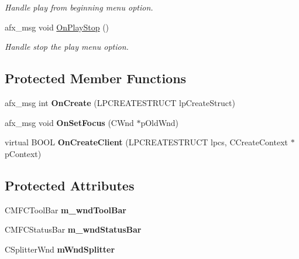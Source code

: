 \begin{DoxyCompactItemize}
\begin{DoxyCompactList}\small\item\em Handle play from beginning menu option. \end{DoxyCompactList}\item 
\hypertarget{class_c_main_frame_a75fade7a5583c8019e2f98d9196509bf}{afx\+\_\+msg void \hyperlink{class_c_main_frame_a75fade7a5583c8019e2f98d9196509bf}{On\+Play\+Stop} ()}\label{class_c_main_frame_a75fade7a5583c8019e2f98d9196509bf}

\begin{DoxyCompactList}\small\item\em Handle stop the play menu option. \end{DoxyCompactList}\end{DoxyCompactItemize}
\subsection*{Protected Member Functions}
\begin{DoxyCompactItemize}
\item 
\hypertarget{class_c_main_frame_a48666466fd37412fcaeff75c3b12e0ed}{afx\+\_\+msg int {\bfseries On\+Create} (L\+P\+C\+R\+E\+A\+T\+E\+S\+T\+R\+U\+C\+T lp\+Create\+Struct)}\label{class_c_main_frame_a48666466fd37412fcaeff75c3b12e0ed}

\item 
\hypertarget{class_c_main_frame_adc353a3d1fc497fbc009b6d9e6914a82}{afx\+\_\+msg void {\bfseries On\+Set\+Focus} (C\+Wnd $\ast$p\+Old\+Wnd)}\label{class_c_main_frame_adc353a3d1fc497fbc009b6d9e6914a82}

\item 
\hypertarget{class_c_main_frame_ac863d694fd3637d492ef97396defbd8e}{virtual B\+O\+O\+L {\bfseries On\+Create\+Client} (L\+P\+C\+R\+E\+A\+T\+E\+S\+T\+R\+U\+C\+T lpcs, C\+Create\+Context $\ast$p\+Context)}\label{class_c_main_frame_ac863d694fd3637d492ef97396defbd8e}

\end{DoxyCompactItemize}
\subsection*{Protected Attributes}
\begin{DoxyCompactItemize}
\item 
\hypertarget{class_c_main_frame_ac8558942627d1502b5095e736840a1f3}{C\+M\+F\+C\+Tool\+Bar {\bfseries m\+\_\+wnd\+Tool\+Bar}}\label{class_c_main_frame_ac8558942627d1502b5095e736840a1f3}

\item 
\hypertarget{class_c_main_frame_a5842bded00e9137fbbf77343b99863be}{C\+M\+F\+C\+Status\+Bar {\bfseries m\+\_\+wnd\+Status\+Bar}}\label{class_c_main_frame_a5842bded00e9137fbbf77343b99863be}

\item 
\hypertarget{class_c_main_frame_a1d68466db594c4bebf41f707bc0a0647}{C\+Splitter\+Wnd {\bfseries m\+Wnd\+Splitter}}\label{class_c_main_frame_a1d68466db594c4bebf41f707bc0a0647}

\end{DoxyCompactItemize}


